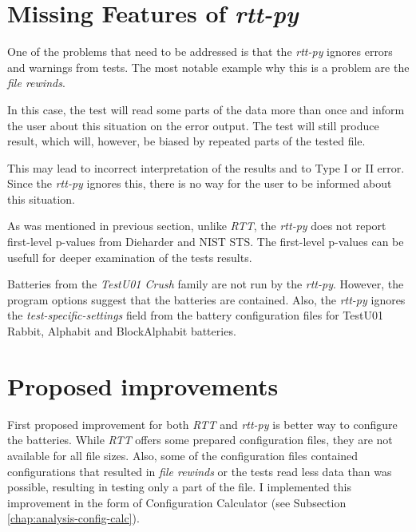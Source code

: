 \documentclass[
  digital,     %
  oneside,     %
  nosansbold,  %
  nocolorbold, %
  nolof,         %
  nolot,         %
]{fithesis4}
\begin{document}
\section{Missing Features of \emph{rtt-py}}
One of the problems that need to be addressed is that the \emph{rtt-py } ignores errors and warnings from tests. The most notable example why this is a problem are the \emph{file rewinds}.

In this case, the test will read some parts of the data more than once and inform the user about this situation on the error output. The test will still produce result, which will, however, be biased by repeated parts of the tested file.

This may lead to incorrect interpretation of the results and to Type I or II error. Since the \emph{rtt-py} ignores this, there is no way for the user to be informed about this situation.

As was mentioned in previous section, unlike \emph{RTT}, the \emph{rtt-py} does not report first-level p-values from Dieharder and NIST STS. The first-level p-values can be usefull for deeper examination of the tests results.

Batteries from the \emph{TestU01 Crush} family are not run by the \emph{rtt-py}. However, the program options suggest that the batteries are contained. Also, the \emph{rtt-py} ignores the \emph{test-specific-settings} field from the battery configuration files for TestU01 Rabbit, Alphabit and BlockAlphabit batteries.




\section{Proposed improvements}
First proposed improvement for both \emph{RTT} and \emph{rtt-py} is better way to configure the batteries. While \emph{RTT} offers some prepared configuration files, they are not available for all file sizes. Also, some of the configuration files contained configurations that resulted in \emph{file rewinds} or the tests read less data than was possible, resulting in testing only a part of the file. I implemented this improvement in the form of Configuration Calculator (see Subsection \ref{chap:analysis-config-calc}).
\end{document}
